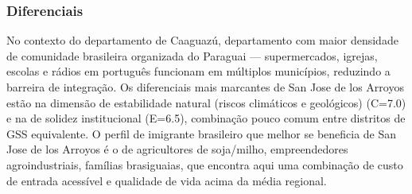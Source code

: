 \subsubsection*{Diferenciais}\label{dif-san-jose-de-los-arroyos-0510}
No contexto do departamento de Caaguazú, departamento com maior densidade de comunidade brasileira organizada do Paraguai — supermercados, igrejas, escolas e rádios em português funcionam em múltiplos municípios, reduzindo a barreira de integração. Os diferenciais mais marcantes de San Jose de los Arroyos estão na dimensão de estabilidade natural (riscos climáticos e geológicos) (C=7.0) e na de solidez institucional (E=6.5), combinação pouco comum entre distritos de GSS equivalente. O perfil de imigrante brasileiro que melhor se beneficia de San Jose de los Arroyos é o de agricultores de soja/milho, empreendedores agroindustriais, famílias brasiguaias, que encontra aqui uma combinação de custo de entrada acessível e qualidade de vida acima da média regional.
